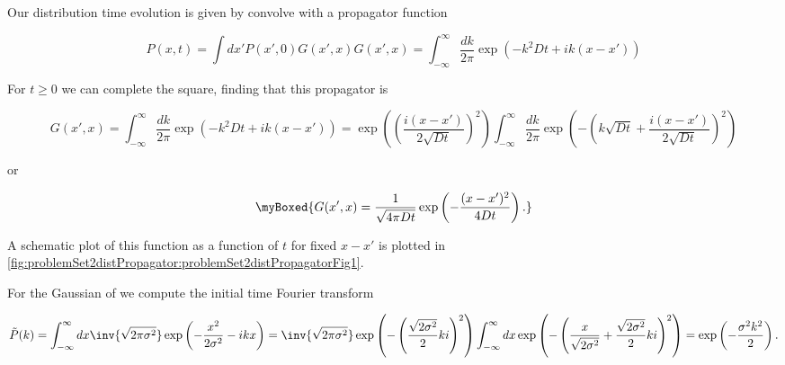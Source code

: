 {Our distribution time evolution is given by convolve with a propagator function

\begin{subequations}
\begin{equation}\label{eqn:basicStatMechProblemSet2Problem1:220}
P(x, t) = \int dx' P(x', 0) G(x', x)
\end{equation}
\begin{equation}\label{eqn:basicStatMechProblemSet2Problem1:240}
G(x', x)
=
\int_{-\infty}^\infty
\frac{dk}{2 \pi}
\exp\left( -k^2 D t + i k (x - x') \right)
\end{equation}
\end{subequations}

For $t \ge 0$ we can complete the square, finding that this propagator is

\begin{dmath}\label{eqn:basicStatMechProblemSet2Problem1:260}
G(x', x)
=
\int_{-\infty}^\infty
\frac{dk}{2 \pi}
\exp\left( -k^2 D t + i k (x - x') \right)
=
\exp\left( \left(\frac{i (x - x')}{2 \sqrt{D t}} \right)^2 \right)
\int_{-\infty}^\infty
\frac{dk}{2 \pi}
\exp\left( - \left(k \sqrt{D t} + \frac{i (x - x')}{2 \sqrt{D t}} \right)^2 \right)
\end{dmath}

or

\begin{equation}\label{eqn:basicStatMechProblemSet2Problem1:360}
\myBoxed
{
G(x', x)
=
\frac{1}{\sqrt{4 \pi D t}} \exp\left(
-\frac{(x - x')^2}{4 D t}
\right).
}
\end{equation}

A schematic plot of this function as a function of $t$ for fixed $x - x'$ is plotted in \cref{fig:problemSet2distPropagator:problemSet2distPropagatorFig1}.



For the Gaussian of  we compute the initial time Fourier transform

\begin{dmath}\label{eqn:basicStatMechProblemSet2Problem1:280}
\tilde{P}(k)
=
\int_{-\infty}^\infty dx
\inv{\sqrt{2 \pi \sigma^2}} \exp
\left(
-\frac{x^2}{2 \sigma^2}
-i k x
\right)
=
\inv{\sqrt{2 \pi \sigma^2}}
\exp
\left(
-\left( \frac{\sqrt{ 2 \sigma^2}}{2} k i
\right)^2
\right)
\int_{-\infty}^\infty dx
\exp
\left(
-\left( \frac{x}{\sqrt{2 \sigma^2} } + \frac{\sqrt{ 2 \sigma^2}}{2} k i
\right)^2
\right)
=
\exp\left(
-\frac{\sigma^2 k^2}{2}
\right).
\end{dmath}

}
